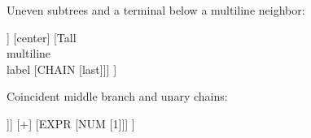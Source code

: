 \documentclass{article}
\begin{document}
Uneven subtrees and a terminal below a multiline neighbor:
\begin{fittedterminaltree}
  [ROOT
    [A wide internal label [left] [next]]
    [center]
    [Tall\\multiline\\label [CHAIN [last]]]
  ]
\end{fittedterminaltree}

Coincident middle branch and unary chains:
\begin{fittedterminaltree}
  [EXPR
    [EXPR [ID [x]]]
    [+]
    [EXPR [NUM [1]]]
  ]
\end{fittedterminaltree}
\end{document}
